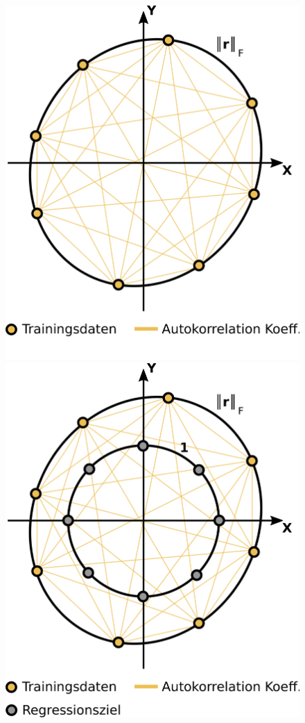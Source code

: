 \documentclass{beamer}
\begin{document}
\begin{frame}
\begin{columns}[c]
\begin{figure}
\begin{overprint}
			\includegraphics[width=\linewidth]{images/GPR_Mapping_Zero_Mean-4}
			\onslide<5>\includegraphics[width=\linewidth]{images/GPR_Mapping_Zero_Mean-5}

\end{overprint}
\end{figure}
\end{columns}
\end{frame}
\end{document}
